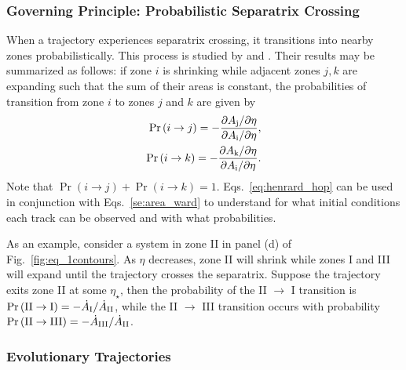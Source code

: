\documentclass[
        fleqn,
        usenatbib,
    ]{mnras}
\newcommand*{\pdil}[2]{\partial#1 / \partial#2}
\newcommand*{\p}[1]{\left(#1\right)}
\begin{document}
\subsubsection{Governing Principle: Probabilistic Separatrix Crossing}

When a trajectory experiences separatrix crossing, it transitions into nearby
zones probabilistically. This process is studied by \citet{henrard1982} and
\citet{henrard1987}. Their results may be summarized as follows: if zone $i$
is shrinking while adjacent zones $j, k$ are expanding such that the sum of
their areas is constant, the probabilities of transition from zone $i$ to zones
$j$ and $k$ are given by
\begin{subequations}\label{eq:henrard_hop}
    \begin{align}
        \Pr\p{i \to j} = -\frac{\pdil{A_{\rm j}}{\eta}}{\pdil{A_{\rm i}}{\eta}},
                \\
        \Pr\p{i \to k} = -\frac{\pdil{A_{\rm k}}{\eta}}{\pdil{A_{\rm i}}{\eta}}.
    \end{align}
\end{subequations}
Note that $\Pr \p{i \to j} + \Pr\p{i \to k} = 1$.
Eqs.~\eqref{eq:henrard_hop} can be used in conjunction with
Eqs.~\eqref{se:area_ward} to understand for what initial conditions each track
can be observed and with what probabilities.

As an example, consider a system in zone II in panel (d) of
Fig.~\ref{fig:eq_1contours}. As $\eta$ decreases, zone II will shrink while
zones I and III will expand until the trajectory crosses the separatrix. Suppose
the trajectory exits zone II at some $\eta_\star$, then the probability of the
II $\to$ I transition is $\Pr\p{\rm II \to I} = -\dot{A}_{\rm I} / \dot{A}_{\rm
II}$, while the II $\to$ III transition occurs with probability $\Pr\p{\rm II
\to III} = -\dot{A}_{\rm III} / \dot{A}_{\rm II}$.

\subsubsection{Evolutionary Trajectories}\label{sss:evol_traj}
\end{document}

